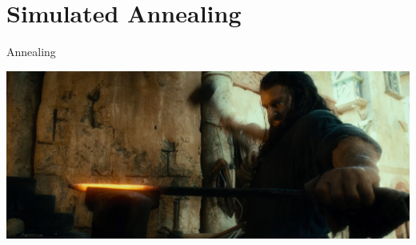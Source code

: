 \documentclass[10pt]{beamer}
\begin{document}
\section{Simulated Annealing}
\begin{frame}{Annealing}

\begin{center} \includegraphics[width = 0.9\linewidth]{img/thorin-blacksmith.jpg} \end{center}

\end{frame}
\end{document}
